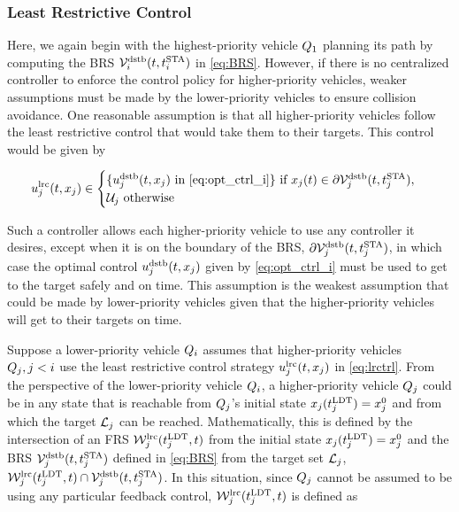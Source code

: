 \subsubsection{Least Restrictive Control \label{sec:lrc}}
Here, we again begin with the highest-priority vehicle $Q_1$ planning its path by computing the BRS $\mathcal{V}_i^\text{dstb}(t, t^\text{STA}_i)$ in \eqref{eq:BRS}. However, if there is no centralized controller to enforce the control policy for higher-priority vehicles, weaker assumptions must be made by the lower-priority vehicles to ensure collision avoidance. One reasonable assumption is that all higher-priority vehicles follow the least restrictive control that would take them to their targets. This control would be given by 

\begin{equation}
\label{eq:lrctrl} %
\ctrl_j^\text{lrc}(t, \state_j)\in \begin{cases} \{\ctrl_j^\text{dstb}(t, \state_j) \text{ in } \eqref{eq:opt_ctrl_i}\} \text{ if } \state_j(t)\in \partial \brs_j^\text{dstb}(t, \sta_j), \\
\cset_j  \text{ otherwise}
\end{cases}
\end{equation}

Such a controller allows each higher-priority vehicle to use any controller it desires, except when it is on the boundary of the BRS, $\partial \mathcal{V}_j^\text{dstb}(t, t^\text{STA}_j)$, in which case the optimal control $u_j^\text{dstb}(t, x_j)$ given by \eqref{eq:opt_ctrl_i} must be used to get to the target safely and on time. This assumption is the weakest assumption that could be made by lower-priority vehicles given that the higher-priority vehicles will get to their targets on time.

Suppose a lower-priority vehicle $Q_i$ assumes that higher-priority vehicles $Q_j, j < i$ use the least restrictive control strategy $u_j^\text{lrc}(t, x_j)$ in \eqref{eq:lrctrl}. From the perspective of the lower-priority vehicle $Q_i$, a higher-priority vehicle $Q_j$ could be in any state that is reachable from $Q_j$'s initial state $x_j(t^\text{LDT}_j) = x_{j}^0$ and from which the target $\mathcal{L}_j$ can be reached. Mathematically, this is defined by the intersection of an FRS $\mathcal{W}_j^\text{lrc}(t^\text{LDT}_j, t)$ from the initial state $x_j(t^\text{LDT}_j)=x_{j}^0$ and the BRS $\mathcal{V}_j^\text{dstb}(t, t^\text{STA}_j)$ defined in \eqref{eq:BRS} from the target set $\mathcal{L}_j$, $\mathcal{W}_j^\text{lrc}(t^\text{LDT}_j, t) \cap \mathcal{V}_j^\text{dstb}(t, t^\text{STA}_j)$. In this situation, since $Q_j$ cannot be assumed to be using any particular feedback control, $\mathcal{W}_j^\text{lrc}(t^\text{LDT}_j, t)$ is defined as

